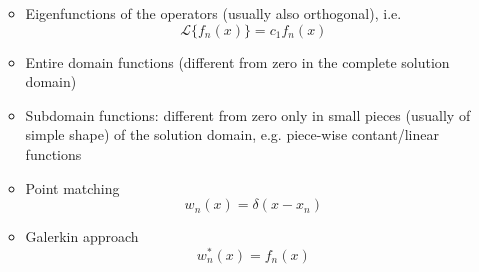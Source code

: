 \begin{itemize}
\begin{itemize}
\begin{equation*}
                \end{equation*}
          \item Eigenfunctions of the operators (usually also orthogonal), i.e.
                \begin{equation*}
                  \mathcal{L}\{f_{n}(x)\} = c_{1}f_{n}(x)
                \end{equation*}
          \item Entire domain functions (different from zero in the complete solution domain)
          \item Subdomain functions: different from zero only in small pieces (usually of simple shape) of the solution domain, e.g. piece-wise contant/linear functions
          \item Point matching
                \begin{equation*}
                  w_{n}(x) = \delta(x - x_{n})
                \end{equation*}
          \item Galerkin approach
                \begin{equation*}
                  w_{n}^{*}(x) = f_{n}(x)
                \end{equation*}
        \end{itemize}
\end{itemize}
